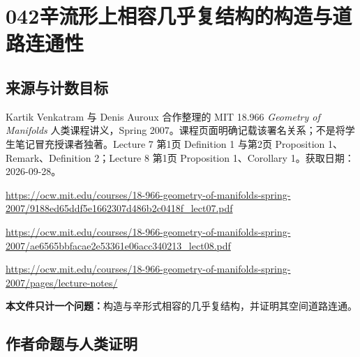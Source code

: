 \documentclass[UTF8,11pt]{ctexart}
\theoremstyle{definition}
\begin{document}
\section*{042\quad 辛流形上相容几乎复结构的构造与道路连通性}
\subsection*{来源与计数目标}
Kartik Venkatram 与 Denis Auroux 合作整理的 MIT 18.966 \emph{Geometry of Manifolds} 人类课程讲义，Spring 2007。课程页面明确记载该署名关系；不是将学生笔记冒充授课者独著。Lecture 7 第1页 Definition 1 与第2页 Proposition 1、Remark、Definition 2；Lecture 8 第1页 Proposition 1、Corollary 1。获取日期：2026-09-28。
\par\url{https://ocw.mit.edu/courses/18-966-geometry-of-manifolds-spring-2007/9188ed65ddf5e1662307d486b2c0418f_lect07.pdf}
\par\url{https://ocw.mit.edu/courses/18-966-geometry-of-manifolds-spring-2007/ae6565bbfacae2e53361e06acc340213_lect08.pdf}
\par\url{https://ocw.mit.edu/courses/18-966-geometry-of-manifolds-spring-2007/pages/lecture-notes/}
\par\textbf{本文件只计一个问题：}构造与辛形式相容的几乎复结构，并证明其空间道路连通。
\subsection*{作者命题与人类证明}
\end{document}
